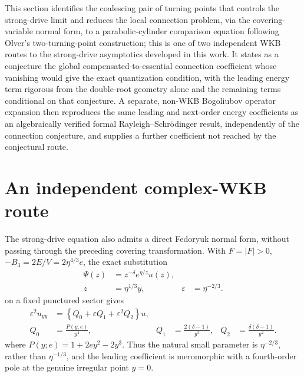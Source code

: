 \documentclass[11pt]{article}
\theoremstyle{remark}
\begin{document}
This section identifies the coalescing pair of turning points that
controls the strong-drive limit and reduces the local connection problem,
via the covering-variable normal form, to a parabolic-cylinder comparison
equation following Olver's two-turning-point construction; this is one of
two independent WKB routes to the strong-drive asymptotics developed in
this work.  It states as a conjecture the global compensated-to-essential
connection coefficient whose vanishing would give the exact quantization
condition, with the leading energy term rigorous from the double-root
geometry alone and the remaining terms conditional on that conjecture.  A
separate, non-WKB Bogoliubov operator expansion then reproduces the same
leading and next-order energy coefficients as an algebraically verified
formal Rayleigh--Schr\"odinger result, independently of the connection
conjecture, and supplies a further coefficient not reached by the
conjectural route.

\section{An independent complex-WKB route}
\label{sec:sectorial-solutions}

The strong-drive equation also admits a direct Fedoryuk normal form, without
passing through the preceding covering transformation.  With \(F=|F|>0\),
\(-B_3=2E/V=2\eta^{4/3}e\), the exact substitution
\begin{equation}
 \begin{aligned}
  \Psi(z)&=z^{-\delta}e^{\eta/z}u(z),\\
  z&=\eta^{1/3}y, & \varepsilon&=\eta^{-2/3}.
 \end{aligned}
 \label{eq:fedoryuk-direct-map}
\end{equation}
on a fixed punctured sector gives
\begin{equation}
 \begin{aligned}
  \varepsilon^2u_{yy}
   &=\left\{Q_0+\varepsilon Q_1+\varepsilon^2Q_2\right\}u,\\
  Q_0&=\frac{P(y;e)}{y^4}, &
  Q_1&=\frac{2(\delta-1)}{y^3}, &
  Q_2&=\frac{\delta(\delta-1)}{y^2}.
 \end{aligned}
 \label{eq:fedoryuk-normal-form}
\end{equation}
where \(P(y;e)=1+2ey^2-2y^3\).  Thus the natural small
parameter is \(\eta^{-2/3}\), rather than \(\eta^{-1/3}\), and the leading
coefficient is meromorphic with a fourth-order pole at the genuine irregular
point \(y=0\).
\end{document}
